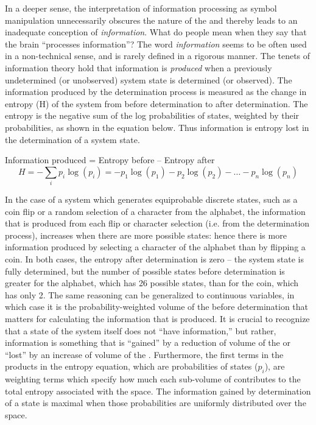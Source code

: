 In a deeper sense, the interpretation of information processing as symbol manipulation unnecessarily obscures the nature of the  and thereby leads to an inadequate conception of \textit{information}. What do people mean when they say that the brain “processes information”? The word \textit{information} seems to be often used in a non-technical sense, and is rarely defined in a rigorous manner. The tenets of information theory \citep{Shannon1948} hold that information is \textit{produced} when a previously undetermined (or unobserved) system state is determined (or observed). The information produced by the determination process is measured as the change in entropy (H) of the system from before determination to after determination. The entropy is the negative sum of the log probabilities of states, weighted by their probabilities, as shown in the equation below. Thus information is entropy lost in the determination of a system state.

\ea
  Information produced = Entropy before – Entropy after
$$
H=-\sum _{i} p_i \log \left(p_i\right) = -p_1 \log \left(p_1\right) - p_2\log \left({p}_{2}\right) - \dots - p_n\log \left({p}_{n}\right)
$$
\z

In the case of a system which generates equiprobable discrete states, such as a coin flip or a random selection of a character from the alphabet, the information that is produced from each flip or character selection (i.e. from the determination process), increases when there are more possible states: hence there is more information produced by selecting a character of the alphabet than by flipping a coin. In both cases, the entropy after determination is zero -- the system state is fully determined, but the number of possible states before determination is greater for the alphabet, which has 26 possible states, than for the coin, which has only 2. The same reasoning can be generalized to continuous variables, in which case it is the probability-weighted volume of the  before determination that matters for calculating the information that is produced. It is crucial to recognize that a state of the system itself does not “have information,” but rather, information is something that is “gained” by a reduction of volume of the  or “lost” by an increase of volume of the . Furthermore, the first terms in the products in the entropy equation, which are probabilities of states ($p_i$), are weighting terms which specify how much each sub-volume of  contributes to the total entropy associated with the space. The information gained by determination of a state is maximal when those probabilities are uniformly distributed over the space.

